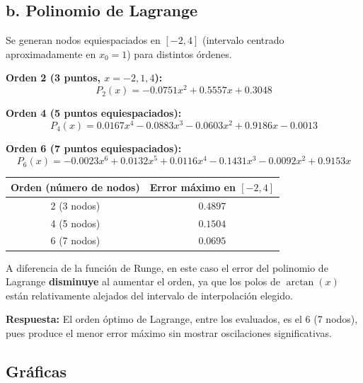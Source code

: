 \documentclass[12pt,a4paper]{article}
\begin{document}
\subsection*{b. Polinomio de Lagrange}

Se generan nodos equiespaciados en $[-2,4]$ (intervalo centrado aproximadamente en $x_0=1$) para distintos \'ordenes.

\textbf{Orden 2 (3 puntos, $x=-2,1,4$):}
\[
P_2(x) = -0.0751x^2 + 0.5557x + 0.3048
\]

\textbf{Orden 4 (5 puntos equiespaciados):}
\[
P_4(x) = 0.0167x^4 - 0.0883x^3 - 0.0603x^2 + 0.9186x - 0.0013
\]

\textbf{Orden 6 (7 puntos equiespaciados):}
\[
P_6(x) = -0.0023x^6 + 0.0132x^5 + 0.0116x^4 - 0.1431x^3 - 0.0092x^2 + 0.9153x
\]

\begin{center}
\begin{tabular}{cc}
\toprule
Orden (n\'umero de nodos) & Error m\'aximo en $[-2,4]$ \\
\midrule
2 (3 nodos) & $0.4897$ \\
4 (5 nodos) & $0.1504$ \\
6 (7 nodos) & $0.0695$ \\
\bottomrule
\end{tabular}
\end{center}

A diferencia de la funci\'on de Runge, en este caso el error del polinomio de Lagrange \textbf{disminuye} al aumentar el orden, ya que los polos de $\arctan(x)$ est\'an relativamente alejados del intervalo de interpolaci\'on elegido.

\textbf{Respuesta:} El orden \'optimo de Lagrange, entre los evaluados, es el $\boxed{6}$ (7 nodos), pues produce el menor error m\'aximo sin mostrar oscilaciones significativas.

\subsection*{Gr\'aficas}

\begin{center}
\end{center}
\end{document}
